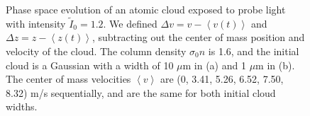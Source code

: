 \documentclass[12pt]{iopart}
\begin{document}
\begin{figure}
\caption{Phase space evolution of an atomic cloud exposed to probe light with intensity $\tilde{I}_0=1.2$. We defined $\Delta v=v -\left< v(t) \right>$  and $\Delta z=z-\left< z(t) \right>$, subtracting out the center of mass position and velocity of the cloud. The column density $\sigma_0 n$ is 1.6, and the initial cloud is a Gaussian with a width of 10 $\mu$m in (a) and 1 $\mu$m in (b). The center of mass velocities $\left< v\right>$ are (0,  3.41, 5.26, 6.52, 7.50, 8.32) m/s sequentially, and are the same for both initial cloud widths. }
\label{fig:phaseSpace}
\end{figure}
\end{document}
